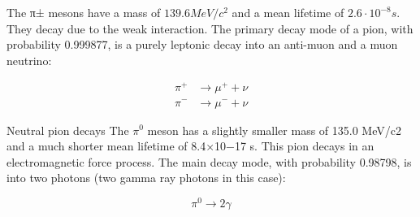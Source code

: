 The π± mesons have a mass of $139.6 MeV/c^2$ and a mean lifetime of $2.6\cdot10^{-8} s$. They decay due to the weak interaction. The primary decay mode of a pion, with probability 0.999877, is a purely leptonic decay into an anti-muon and a muon neutrino:

\begin{align*}
\pi^+    &\to    \mu^+    +    \nu \\
\pi^-    &\to    \mu^-    +    \nu 
\end{align*}

Neutral pion decays
The $\pi^0$ meson has a slightly smaller mass of 135.0 MeV/c2 and a much shorter mean lifetime of 8.4×10−17 s. This pion decays in an electromagnetic force process. The main decay mode, with probability 0.98798, is into two photons (two gamma ray photons in this case):

\[ \pi^0 \to 2 \gamma  \]




